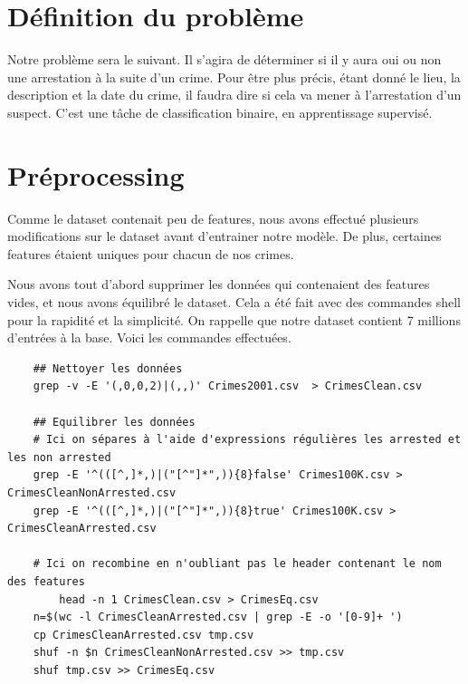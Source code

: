 \documentclass{article}
\begin{document}
    \section{Définition du problème}
    Notre problème sera le suivant. Il s'agira de déterminer si il y aura
    oui ou non une arrestation à la suite d'un crime. 
    Pour être plus précis, étant donné le lieu, la description et la date du crime, 
    il faudra dire si cela va mener à l'arrestation d'un suspect.
    C'est une tâche de classification
    binaire, en apprentissage supervisé.

    \section{Préprocessing}
    Comme le dataset contenait peu de features, 
    nous avons effectué plusieurs modifications sur le dataset avant d'entrainer notre modèle.
    De plus, certaines features étaient uniques pour chacun de nos crimes.

    Nous avons tout d'abord supprimer les données qui contenaient des features vides, et nous avons
    équilibré le dataset.
    Cela a été fait avec des commandes shell pour la rapidité et la simplicité. On rappelle que notre dataset contient 7 millions d'entrées à la base.
    Voici les commandes effectuées.

    \begin{Verbatim}
	## Nettoyer les données
	grep -v -E '(,0,0,2)|(,,)' Crimes2001.csv  > CrimesClean.csv
	
	## Equilibrer les données
	# Ici on sépares à l'aide d'expressions régulières les arrested et les non arrested
	grep -E '^(([^,]*,)|("[^"]*",)){8}false' Crimes100K.csv > CrimesCleanNonArrested.csv
	grep -E '^(([^,]*,)|("[^"]*",)){8}true' Crimes100K.csv > CrimesCleanArrested.csv
	
	# Ici on recombine en n'oubliant pas le header contenant le nom des features
    	head -n 1 CrimesClean.csv > CrimesEq.csv
	n=$(wc -l CrimesCleanArrested.csv | grep -E -o '[0-9]+ ')
	cp CrimesCleanArrested.csv tmp.csv
	shuf -n $n CrimesCleanNonArrested.csv >> tmp.csv
	shuf tmp.csv >> CrimesEq.csv
\end{Verbatim}
\end{document}
